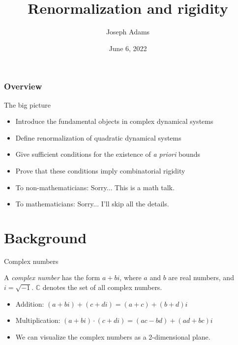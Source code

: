 \documentclass{beamer}
\title{Renormalization and rigidity}
\author{Joseph Adams}
\date{June 6, 2022}
\begin{document}
\begin{frame}

\titlepage

\end{frame}

\begin{frame}
    \frametitle{Overview}
    \tableofcontents
\end{frame}

\begin{frame}{The big picture}
\begin{itemize}
    \item Introduce the fundamental objects in complex dynamical systems
    \item Define renormalization of quadratic dynamical systems
    \item Give sufficient conditions for the existence of \emph{a priori} bounds
    \item Prove that these conditions imply combinatorial rigidity
    \item To non-mathematicians: Sorry... This is a math talk.
    \item To mathematicians: Sorry... I'll skip all the details.
\end{itemize}
\end{frame}

\section{Background}
\begin{frame}{Complex numbers}

\begin{definition}
A \emph{complex number} has the form $a+bi$, where $a$ and $b$ are real numbers, and $i=\sqrt{-1}$. $\mathbb{C}$ denotes the set of all complex numbers.
\end{definition}

\begin{itemize}
    \item Addition: $(a+bi)+(c+di)=(a+c)+(b+d)i$
    \item Multiplication: $(a+bi)\cdot(c+di)=(ac-bd)+(ad+bc)i$
    \item We can visualize the complex numbers as a 2-dimensional plane.
\end{itemize}

\end{frame}
\end{document}
